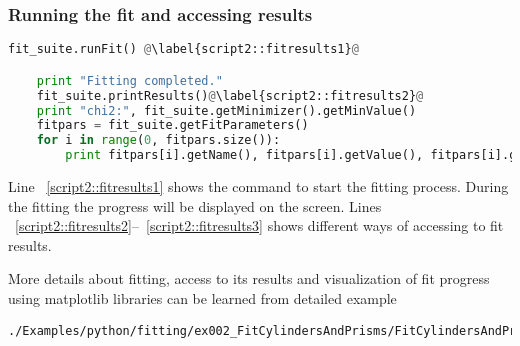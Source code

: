 \subsubsection*{Running the fit and accessing results}
\begin{lstlisting}[language=python, style=eclipseboxed, firstnumber=66]
    fit_suite.runFit() @\label{script2::fitresults1}@

    print "Fitting completed."
    fit_suite.printResults()@\label{script2::fitresults2}@
    print "chi2:", fit_suite.getMinimizer().getMinValue() 
    fitpars = fit_suite.getFitParameters()
    for i in range(0, fitpars.size()):
        print fitpars[i].getName(), fitpars[i].getValue(), fitpars[i].getError() @\label{script2::fitresults3}@
\end{lstlisting}
Line ~\ref{script2::fitresults1} shows the command to start the fitting process.
During the fitting the progress will be displayed on the screen.
Lines ~\ref{script2::fitresults2}--~\ref{script2::fitresults3} shows different ways of
accessing to fit results.


More details about fitting, access to its results and visualization of fit progress using matplotlib libraries can be learned from detailed example
\begin{lstlisting}[language=shell, style=commandline]
./Examples/python/fitting/ex002_FitCylindersAndPrisms/FitCylindersAndPrisms_detailed.py
\end{lstlisting}

